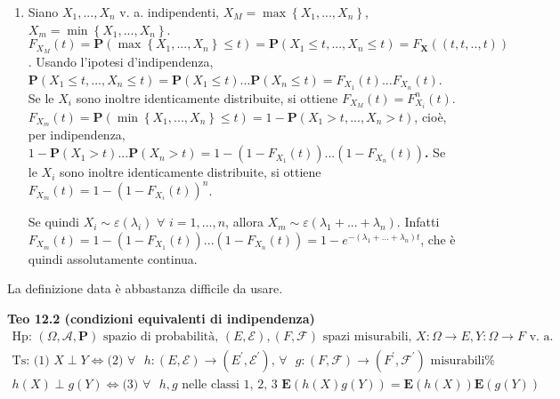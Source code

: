 \documentclass{article}
\begin{document}
\begin{enumerate}
\item Siano $X_{1},...,X_{n}$ v. a. indipendenti, $X_{M}=\max \left\{
X_{1},...,X_{n}\right\} $, $X_{m}=\min \left\{ X_{1},...,X_{n}\right\} $. $%
F_{X_{M}}\left( t\right) =\mathbf{P}\left( \max \left\{
X_{1},...,X_{n}\right\} \leq t\right) =\mathbf{P}\left( X_{1}\leq
t,...,X_{n}\leq t\right) =F_{\mathbf{X}}\left( \left( t,t,..,t\right)
\right) $. Usando l'ipotesi d'indipendenza, $\mathbf{P}\left( X_{1}\leq
t,...,X_{n}\leq t\right) =\mathbf{P}\left( X_{1}\leq t\right) ...\mathbf{P}%
\left( X_{n}\leq t\right) =F_{X_{1}}\left( t\right) ...F_{X_{n}}\left(
t\right) $. Se le $X_{i}$ sono inoltre identicamente distribuite, si ottiene 
$F_{X_{M}}\left( t\right) =F_{X_{i}}^{n}\left( t\right) $. $F_{X_{m}}\left(
t\right) =\mathbf{P}\left( \min \left\{ X_{1},...,X_{n}\right\} \leq
t\right) =1-\mathbf{P}\left( X_{1}>t,...,X_{n}>t\right) $, cio\`{e}, per
indipendenza, $1-\mathbf{P}\left( X_{1}>t\right) ...\mathbf{P}\left(
X_{n}>t\right) =1-\left( 1-F_{X_{1}}\left( t\right) \right) ...\left(
1-F_{X_{n}}\left( t\right) \right) $\textbf{. }Se le $X_{i}$ sono inoltre
identicamente distribuite, si ottiene $F_{X_{m}}\left( t\right) =1-\left(
1-F_{X_{i}}\left( t\right) \right) ^{n}$.

Se quindi $X_{i}\sim \varepsilon \left( \lambda _{i}\right) $ $\forall $ $%
i=1,...,n$, allora $X_{m}\sim \varepsilon \left( \lambda _{1}+...+\lambda
_{n}\right) $. Infatti $F_{X_{m}}\left( t\right) =1-\left( 1-F_{X_{1}}\left(
t\right) \right) ...\left( 1-F_{X_{n}}\left( t\right) \right) =1-e^{-\left(
\lambda _{1}+...+\lambda _{n}\right) t}$, che \`{e} quindi assolutamente
continua.
\end{enumerate}

La definizione data \`{e} abbastanza difficile da usare.

\textbf{Teo 12.2 (condizioni equivalenti di indipendenza)}%
\begin{gather*}
\text{Hp}\text{: }\left( \Omega ,\mathcal{A},\mathbf{P}\right) \text{ spazio
di probabilit\`{a}, }\left( E,\mathcal{E}\right) ,\left( F,\mathcal{F}%
\right) \text{ spazi misurabili, }X:\Omega \rightarrow E,Y:\Omega
\rightarrow F\text{ v. a.} \\
\text{Ts}\text{: (1) }X\perp Y\Longleftrightarrow \text{(2) }\forall \text{ }%
h:\left( E,\mathcal{E}\right) \rightarrow \left( E^{\prime },\mathcal{E}%
^{\prime }\right) \text{, }\forall \text{ }g:\left( F,\mathcal{F}\right)
\rightarrow \left( F^{\prime },\mathcal{F}^{\prime }\right) \text{ misurabili%
} \\
h\left( X\right) \perp g\left( Y\right) \Longleftrightarrow \text{(3) }%
\forall \text{ }h,g\text{ nelle classi 1, 2, 3 }\mathbf{E}\left( h\left(
X\right) g\left( Y\right) \right) =\mathbf{E}\left( h\left( X\right) \right) 
\mathbf{E}\left( g\left( Y\right) \right)
\end{gather*}
\end{document}

